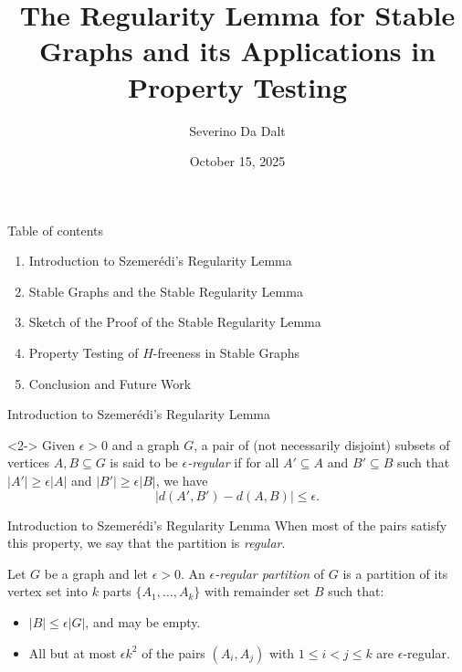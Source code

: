 \documentclass{beamer}
\title[Regularity for Stable Graphs]{The Regularity Lemma for Stable Graphs and its Applications in Property Testing}
\author{Severino Da Dalt}
\institute[]{Supervised by Lluís Vena Cros}
\date{October 15, 2025}
\newcommand{\parcurly}[1]{\{ #1 \}}
\begin{document}
\nocite{*} %

\begin{frame}
    \titlepage
\end{frame}

\begin{frame}{Table of contents}
    \begin{enumerate}
        \item Introduction to Szemerédi's Regularity Lemma
        \item Stable Graphs and the Stable Regularity Lemma
        \item Sketch of the Proof of the Stable Regularity Lemma
        \item Property Testing of $H$-freeness in Stable Graphs
        \item Conclusion and Future Work
    \end{enumerate}
\end{frame}

\begin{frame}{Introduction to Szemerédi's Regularity Lemma}

    \begin{definition}<2->
        Given $\epsilon > 0$ and a graph $G$, a pair of (not necessarily disjoint) subsets of vertices $A, B \subseteq G$
        is said to be \emph{$\epsilon$-regular} if for all $A' \subseteq A$ and $B' \subseteq B$ such that
        $|A'| \geq \epsilon |A|$ and $|B'| \geq \epsilon |B|$, we have
        \[
            |d(A', B') - d(A, B)| \leq \epsilon.
        \]
    \end{definition}
\end{frame}

\begin{frame}{Introduction to Szemerédi's Regularity Lemma}
    When most of the pairs satisfy this property, we say that the partition is \emph{regular}.

    \begin{definition}
        Let $G$ be a graph and let $\epsilon > 0$.
        An \emph{$\epsilon$-regular partition} of $G$ is a partition of its vertex set into $k$ parts
        $\parcurly{A_1, \ldots, A_k}$ with remainder set $B$ such that:
        \begin{itemize}
            \item $|B| \leq \epsilon |G|$, and may be empty.
            \item All but at most $\epsilon k^2$ of the pairs $(A_i, A_j)$ with $1 \leq i < j \leq k$ are
                $\epsilon$-regular.
        \end{itemize}
    \end{definition}
\end{frame}
\end{document}
